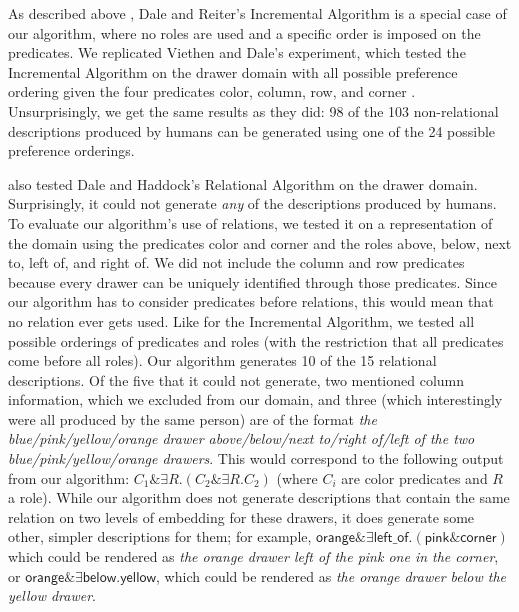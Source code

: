 As described above , Dale and Reiter's
Incremental Algorithm is a special case of our algorithm, where no
roles are used and a specific order is imposed on the predicates. We
replicated Viethen and Dale's experiment, which tested the Incremental
Algorithm on the drawer domain with all possible preference ordering
given the four predicates
\textsf{color, column, row}, and \textsf{corner}
\cite{viethen06:_algor_for_gener_refer_expres}.  Unsurprisingly, we
get the same results as they did: 98 of the 103 non-relational
descriptions produced by humans can be generated using one of the 24
possible preference orderings.

 also tested Dale and
Haddock's 
Relational Algorithm on the drawer domain. Surprisingly, it could not
generate \textit{any} of the descriptions produced by humans. To
evaluate our algorithm's use of relations, we tested it on a
representation of the domain using the predicates \textsf{color} and
\textsf{corner} and the roles \textsf{above, below, next to, left of},
and \textsf{right of}. We did not include the \textsf{column} and
\textsf{row} predicates because every drawer can be uniquely
identified through those predicates. Since our algorithm has to
consider predicates before relations, this would mean that no relation
ever gets used. Like for the Incremental Algorithm, we tested all
possible orderings of predicates and roles (with the restriction that
all predicates come before all roles). Our algorithm generates 10 of
the 15 relational descriptions. Of the five that it could not
generate, two mentioned column information, which we excluded from our
domain, and three (which interestingly were all produced by the same
person) are of the format \textit{the blue/pink/yellow/orange drawer
above/below/next to/right of/left of the two blue/pink/yellow/orange
drawers}. This would correspond to the following output from our
algorithm: $C_1 \& \exists R . (C_2 \& \exists R . C_2)$ (where $C_i$
are color predicates and $R$ a role). While our algorithm does not
generate descriptions that contain the same relation on two levels of
embedding for these drawers, it does generate some other, simpler
descriptions for them; for example, $\textsf{orange} \& \exists
\textsf{left\_of} . (\textsf{pink}
\& \textsf{corner})$ which could be rendered as
\textit{the orange drawer left of the pink one in the corner}, or
$\textsf{orange} \& \exists \textsf{below} . \textsf{yellow}$,
which could be rendered as \textit{the orange drawer below the yellow
drawer}.



